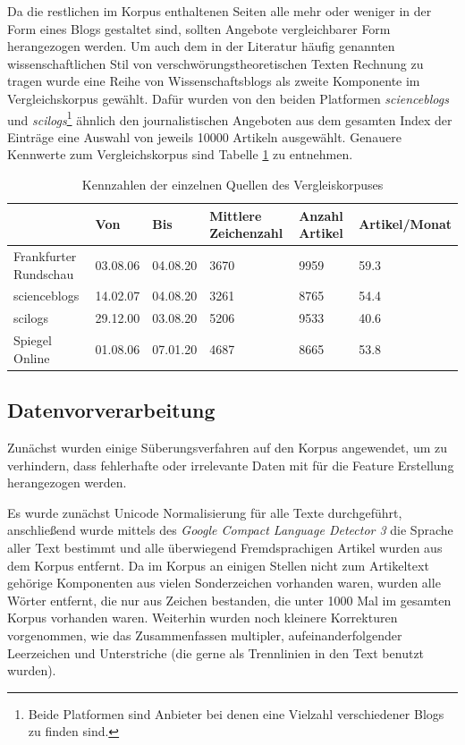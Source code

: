 Da die restlichen im Korpus enthaltenen Seiten alle mehr oder weniger in der Form eines Blogs gestaltet sind, sollten Angebote vergleichbarer Form herangezogen werden.
Um auch dem in der Literatur häufig genannten wissenschaftlichen Stil von verschwörungstheoretischen Texten Rechnung zu tragen wurde eine Reihe von Wissenschaftsblogs als zweite Komponente im Vergleichskorpus gewählt.
Dafür wurden von den beiden Platformen \textit{scienceblogs} und \textit{scilogs}\footnote{Beide Platformen sind Anbieter bei denen eine Vielzahl verschiedener Blogs zu finden sind.} ähnlich den journalistischen Angeboten aus dem gesamten Index der Einträge eine Auswahl von jeweils 10000 Artikeln ausgewählt.
Genauere Kennwerte zum Vergleichskorpus sind Tabelle \ref{comcorpus-stats} zu entnehmen.

\begin{table}
    \begin{center}
        \begin{tabularx}{\textwidth}{l|XXXXX}
            \toprule
            & Von & Bis & Mittlere Zeichenzahl & Anzahl Artikel & Artikel/Monat\\
            \midrule
            Frankfurter Rundschau & 03.08.06 & 04.08.20 & 3670 & 9959 & 59.3\\
            scienceblogs & 14.02.07 & 04.08.20 & 3261 & 8765 & 54.4\\
            scilogs & 29.12.00 & 03.08.20 & 5206 & 9533 & 40.6\\
            Spiegel Online & 01.08.06 & 07.01.20 & 4687 & 8665 & 53.8\\
            \bottomrule
        \end{tabularx}
        \caption{Kennzahlen der einzelnen Quellen des Vergleiskorpuses}
        \label{comcorpus-stats}
    \end{center}
\end{table}

\subsection{Datenvorverarbeitung}

Zunächst wurden einige Süberungsverfahren auf den Korpus angewendet, um zu verhindern, dass fehlerhafte oder irrelevante Daten mit für die Feature Erstellung herangezogen werden.

Es wurde zunächst Unicode Normalisierung für alle Texte durchgeführt, anschließend wurde mittels des \textit{Google Compact Language Detector 3} \parencite[][]{cld3} die Sprache aller Text bestimmt und alle überwiegend Fremdsprachigen Artikel wurden aus dem Korpus entfernt.
Da im Korpus an einigen Stellen nicht zum Artikeltext gehörige Komponenten aus vielen Sonderzeichen vorhanden waren, wurden alle Wörter entfernt, die nur aus Zeichen bestanden, die unter 1000 Mal im gesamten Korpus vorhanden waren.
Weiterhin wurden noch kleinere Korrekturen vorgenommen, wie das Zusammenfassen multipler, aufeinanderfolgender Leerzeichen und Unterstriche (die gerne als Trennlinien in den Text benutzt wurden).

